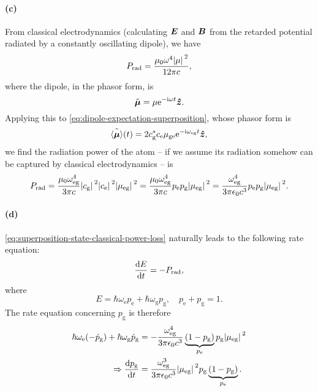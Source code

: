 \documentclass[hyperref, a4paper]{article}
\newcommand*{\ii}{\mathrm{i}}
\newcommand*{\ee}{\mathrm{e}}
\newcommand*{\omegae}{\omega_{\text{e}}}
\newcommand*{\omegag}{\omega_{\text{g}}}
\newcommand*{\omegaeg}{\omega_{\text{eg}}}
\newcommand*{\mueg}{\mu_{\text{eg}}}
\newcommand*{\muge}{\mu_{\text{ge}}}
\newcommand*{\coeffe}{c_{\text{e}}}
\newcommand*{\coeffg}{c_{\text{g}}}
\newcommand*{\pope}{p_{\text{e}}}
\newcommand*{\popg}{p_{\text{g}}}
\begin{document}
\paragraph{(c)} From classical electrodynamics 
(calculating $\vb*{E}$ and $\vb*{B}$ from 
the retarded potential radiated by a constantly oscillating dipole),
we have 
\begin{equation}
    P_{\text{rad}} = \frac{\mu_0 \omega^4 \abs*{\mu}^2}{12 \pi c},
\end{equation}
where the dipole, in the phasor form, is 
\begin{equation}
    \tilde{\vb*{\mu}} = \mu \ee^{- \ii \omega t} \vu*{z}.
\end{equation}
Applying this to \eqref{eq:dipole-expectation-superposition},
whose phasor form is 
\begin{equation}
    \tilde{\expval{\vb*{\mu}}}(t) =
    2 \coeffg^* \coeffe \muge \ee^{- \ii \omegaeg t}  \vu*{z},
\end{equation}
we find the radiation power of the atom -- 
if we assume its radiation somehow can be captured by classical electrodynamics --
is 
\begin{equation}
    P_{\text{rad}} = \frac{\mu_0 \omegaeg^4 }{3 \pi c} 
    \abs*{\coeffg}^2 \abs*{\coeffe}^2 \abs*{\mueg}^2
    = \frac{\mu_0 \omegaeg^4 }{3 \pi c} 
    \pope \popg \abs*{\mueg}^2
    = \frac{\omegaeg^4 }{3 \pi \epsilon_0 c^3} 
    \pope \popg \abs*{\mueg}^2 .
    \label{eq:superposition-state-classical-power-loss}
\end{equation} 

\paragraph{(d)} \eqref{eq:superposition-state-classical-power-loss} 
naturally leads to the following rate equation:
\begin{equation}
    \dv{E}{t} = - P_{\text{rad}}, 
\end{equation}
where 
\begin{equation}
    E = \hbar \omegae \pope + \hbar \omegag \popg, \quad 
    \pope + \popg = 1.
\end{equation}
The rate equation concerning $\popg$ is therefore 
\begin{equation}
    \begin{aligned}
        \hbar \omegae (- \dot{p}_{\text{g}}) + \hbar \omegag \dot{p}_{\text{g}}
        &= - \frac{\omegaeg^4 }{3 \pi \epsilon_0 c^3} 
        \underbrace{(1 - \popg)}_{\pope} \popg \abs*{\mueg}^2 \\
        \Rightarrow 
        \dv{\popg}{t} &= \frac{\omegaeg^3}{3 \pi \epsilon_0 c^3} \abs*{\mueg}^2 \popg \underbrace{
            (1 - \popg)
        }_{\pope}.
    \end{aligned}
\end{equation}
\end{document}
